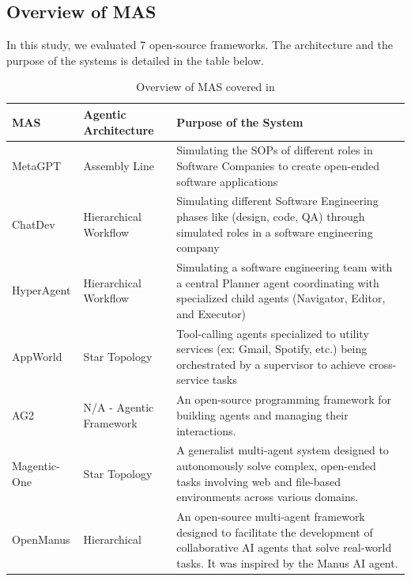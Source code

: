 \subsection{Overview of MAS}
In this study, we evaluated 7 open-source frameworks. The architecture and the purpose of the systems is detailed in the table below.

\begin{table}[h]
\vskip -0.15in
\caption{Overview of MAS covered in \dataset{}} 
\begin{center}
\begin{small}
\begin{tabular}{>{\centering\arraybackslash}m{2.8cm} >{\centering\arraybackslash}m{2.5cm} m{7.2cm}}
\toprule
MAS & Agentic Architecture & Purpose of the System \\
\midrule
MetaGPT\newline\cite{hong2023metagpt} & Assembly Line & Simulating the SOPs of different roles in Software Companies to create open-ended software applications \\ \hline
ChatDev\newline\cite{chatdev} & Hierarchical Workflow & Simulating different Software Engineering phases like (design, code, QA) through simulated roles in a software engineering company\\ \hline
HyperAgent\newline\cite{phan2024hyperagent} & Hierarchical Workflow & Simulating a software engineering team with a central Planner agent coordinating with specialized child agents (Navigator, Editor, and Executor)\\ \hline
AppWorld\newline\cite{trivedi2024appworld} & Star Topology & Tool-calling agents specialized to utility services (ex: Gmail, Spotify, etc.) being orchestrated by a supervisor to achieve cross-service tasks \\ \hline
AG2\newline\cite{wu2024autogen} & N/A - Agentic Framework & An open-source programming framework for building agents and managing their interactions.  \\ \hline
Magentic-One\newline\cite{fourney2024magentic} & Star Topology & A generalist multi-agent system designed to autonomously solve complex, open-ended tasks involving web and file-based environments across various domains.  \\ \hline
OpenManus\newline\cite{openmanus2025} & Hierarchical & An open-source multi-agent framework designed to facilitate the development of collaborative AI agents that solve real-world tasks. It was inspired by the Manus AI agent. \\
\bottomrule
\end{tabular}
\end{small}
\label{tab:annotated-mas}
\end{center}
\vskip -0.2in
\end{table}


